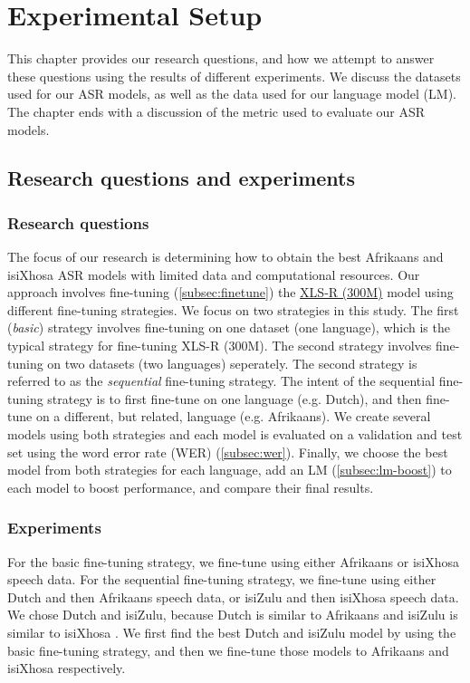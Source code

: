 \graphicspath{{experimental_setup/fig/}}

\chapter{Experimental Setup} \label{chap:experimental_setup}
This chapter provides our research questions, and how we attempt to answer
these questions using the results of different experiments. We discuss the datasets used for
our ASR models, as well as the data used for our language model (LM).
The chapter ends with a discussion of the metric used to evaluate our ASR models.

\section{Research questions and experiments}
\subsection{Research questions}
The focus of our research is determining how to obtain the best Afrikaans and isiXhosa ASR models with limited data and computational resources.
Our approach involves fine-tuning (\ref{subsec:finetune}) the \href{https://huggingface.co/facebook/wav2vec2-xls-r-300m}{XLS-R (300M)} model using different fine-tuning strategies.
We focus on two strategies in this study. The first (\emph{basic}) strategy involves fine-tuning on one dataset (one language),
which is the typical strategy for fine-tuning XLS-R (300M). The second strategy involves fine-tuning on two datasets (two languages) seperately.
The second strategy is referred to as the \emph{sequential} fine-tuning strategy. The intent of the sequential fine-tuning strategy is
to first fine-tune on one language (e.g. Dutch), and then fine-tune on a different, but related, language (e.g. Afrikaans).
We create several models using both strategies and each model is evaluated on a validation and test set using the word error rate (WER) (\ref{subsec:wer}).
Finally, we choose the best model from both strategies for each language, add an LM (\ref{subsec:lm-boost}) to each model to boost performance, and compare their final results.

\subsection{Experiments}
For the basic fine-tuning strategy, we fine-tune using either Afrikaans or isiXhosa speech data.
For the sequential fine-tuning strategy, we fine-tune using either Dutch and then Afrikaans speech data, 
or isiZulu and then isiXhosa speech data. We chose Dutch and isiZulu, 
because Dutch is similar to Afrikaans \cite{wikipedia2023comparison_afrikaans_dutch} 
and isiZulu is similar to isiXhosa \cite{msskapstadt2023progressively_repurpose}.
We first find the best Dutch and isiZulu model by using the basic fine-tuning strategy,
and then we fine-tune those models to Afrikaans and isiXhosa respectively.

